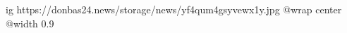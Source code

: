  
 
 
 
 

\ifcmt
  ig https://donbas24.news/storage/news/yf4qum4gsyvewx1y.jpg
  @wrap center
  @width 0.9
\fi
